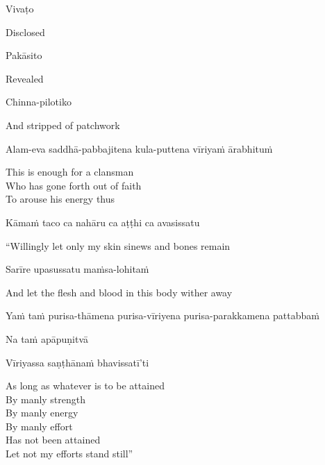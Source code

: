 Vivaṭo

\begin{english}
  Disclosed
\end{english}

Pakāsito

\begin{english}
  Revealed
\end{english}

Chinna-pilotiko

\begin{english}
  And stripped of patchwork
\end{english}

Alam-eva saddhā-pabbajitena kula-puttena vīriyaṁ ārabhituṁ

\begin{english-verses}
  This is enough for a clansman\\
  Who has gone forth out of faith\\
  To arouse his energy thus
\end{english-verses}

Kāmaṁ taco ca nahāru ca aṭṭhi ca avasissatu

\begin{english}
  ``Willingly let only my skin  sinews  and bones remain
\end{english}

Sarīre upasussatu maṁsa-lohitaṁ

\begin{english}
  And let the flesh and blood in this body wither away
\end{english}

\begin{pali-hang}
  Yaṁ taṁ purisa-thāmena purisa-vīriyena purisa-parakkamena pattabbaṁ\\
\end{pali-hang}
\begin{pali-hangtogether}
  Na taṁ apāpuṇitvā\\
\end{pali-hangtogether}
\begin{pali-hangtogether}
  Vīriyassa saṇṭhānaṁ bhavissatī'ti
\end{pali-hangtogether}

\begin{english-verses}
  As long as whatever is to be attained\\
  By manly strength\\
  By manly energy\\
  By manly effort\makeatletter\hyperlink{endnote87-appendix}\makeatother\\
  Has not been attained\\
  Let not my efforts stand still''
\end{english-verses}


